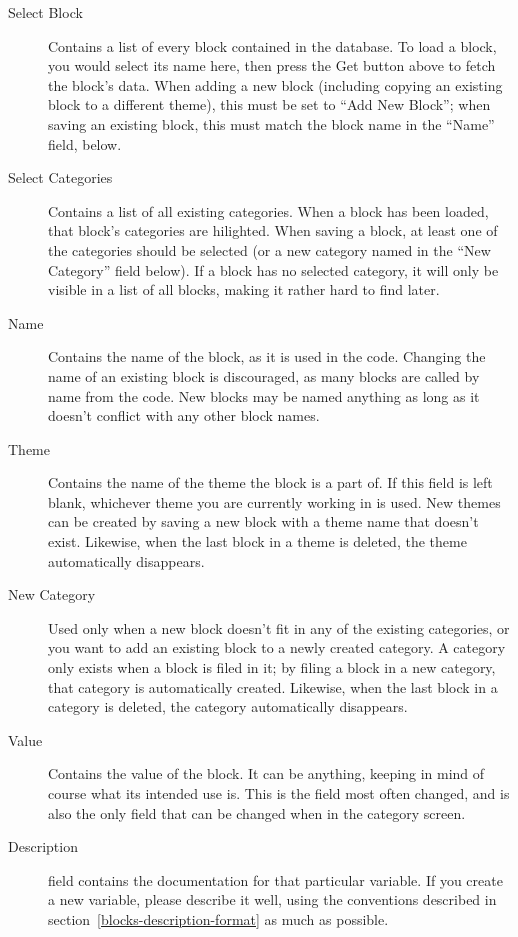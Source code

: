 \begin{description}
\item[Select Block] Contains a list of every block contained in the database. To load a block, you would select its name here, then press the Get button above to fetch the block's data. When adding a new block (including copying an existing block to a different theme), this must be set to ``Add New Block''; when saving an existing block, this must match the block name in the ``Name'' field, below.
\item[Select Categories] Contains a list of all existing categories. When a block has been loaded, that block's categories are hilighted. When saving a block, at least one of the categories should be selected (or a new category named in the ``New Category'' field below). If a block has no selected category, it will only be visible in a list of all blocks, making it rather hard to find later.
\item[Name] Contains the name of the block, as it is used in the code. Changing the name of an existing block is discouraged, as many blocks are called by name from the code. New blocks may be named anything as long as it doesn't conflict with any other block names.
\item[Theme] Contains the name of the theme the block is a part of.  If this field is left blank, whichever theme you are currently working in is used.  New themes can be created by saving a new block with a theme name that doesn't exist.  Likewise, when the last block in a theme is deleted, the theme automatically disappears.
\item[New Category] Used only when a new block doesn't fit in any of the existing categories, or you want to add an existing block to a newly created category. A category only exists when a block is filed in it; by filing a block in a new category, that category is automatically created. Likewise, when the last block in a category is deleted, the category automatically disappears.
\item[Value] Contains the value of the block. It can be anything, keeping in mind of course what its intended use is. This is the field most often changed, and is also the only field that can be changed when in the category screen.
\item[Description] field contains the documentation for that particular variable. If you create a new variable, please describe it well, using the conventions described in section~\ref{blocks-description-format} as much as possible. 
\end{description}

